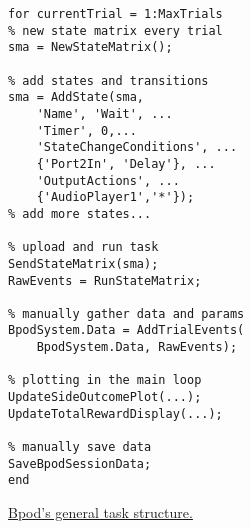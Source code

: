 \begin{marginfigure}[0.35cm]
\begin{verbatim}
for currentTrial = 1:MaxTrials
% new state matrix every trial
sma = NewStateMatrix();

% add states and transitions
sma = AddState(sma, 
    'Name', 'Wait', ...
    'Timer', 0,...
    'StateChangeConditions', ...
    {'Port2In', 'Delay'}, ...
    'OutputActions', ...
    {'AudioPlayer1','*'});
% add more states...

% upload and run task
SendStateMatrix(sma);
RawEvents = RunStateMatrix;

% manually gather data and params
BpodSystem.Data = AddTrialEvents(
    BpodSystem.Data, RawEvents);
    
% plotting in the main loop
UpdateSideOutcomePlot(...);
UpdateTotalRewardDisplay(...);

% manually save data
SaveBpodSessionData;
end
\end{verbatim}
\caption{\href{https://github.com/sanworks/Bpod_Gen2/blob/master/Examples/Protocols/AnalogSound2AFC/AnalogSound2AFC.m}{Bpod's general task structure.}}
\label{fig:bpodtask}
\end{marginfigure}\nobreak
